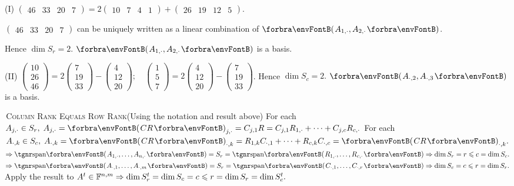 \documentclass[a4paper, 11pt, UTF8]{article}
\begin{document}
\begin{large}
(I) {\normalsize$\begin{pmatrix} 46 & 33 & 20 & 7 \end{pmatrix}=2\begin{pmatrix} 10 & 7 & 4 & 1\end{pmatrix}+\begin{pmatrix} 26 & 19 & 12 & 5\end{pmatrix}$}.\vspace{3pt}\par\quad\HI
{\small$\begin{pmatrix} 46 & 33 & 20 & 7 \end{pmatrix}$} can be uniquely written as a linear combination of $\Par{A_{1,\cdot},A_{2,\cdot}}$.\vspace{3pt}\par\quad\HI
Hence $\dim S_r=2$. $\Par{A_{1,\cdot},A_{2,\cdot}}$ is a basis.\par\vspace{6pt}\quad\EndI
(II) {\normalsize$\begin{pmatrix} 10\\ 26\\ 46\end{pmatrix}=2\begin{pmatrix} 7\\ 19\\ 33\end{pmatrix}-\begin{pmatrix} 4\\ 12\\ 20\end{pmatrix}; \quad \begin{pmatrix} 1\\ 5\\ 7\end{pmatrix}=2\begin{pmatrix} 4\\ 12\\ 20\end{pmatrix}-\begin{pmatrix} 7\\ 19\\ 33\end{pmatrix}$}. \;Hence $\dim S_c=2.$ $\Par{A_{\cdot,2},A_{\cdot,3}}$ is a basis.\vspace{6pt}\par
\SepLine
\pagebreak

\BulletPoint \,\hspace{1pt}\textsc{Column Rank Equals Row Rank}\quad (Using the notation and result above)\TextB{}
For each $A_{j,\cdot}\in S_r,\;A_{j,\cdot}=\Par{CR}_{j,\cdot}=C_{j,1}R=C_{j,1}R_{1,\cdot}+\dots+C_{j,c}R_{c,\cdot}$\TextB{}
For each $A_{\cdot,k}\in S_c,\;A_{\cdot,k}=\Par{CR}_{\cdot,k}=R_{1,k}C_{\cdot,1}+\dots+R_{c,k}C_{\cdot,c}=\Par{CR}_{\cdot,k}.$\TextB{}
$\Rightarrow\Span{A_{1,\cdot},\dots,A_{n,\cdot}}=S_r=\Span{R_{1,\cdot},\dots,R_{c,\cdot}}\Rightarrow\dim S_r=r\leqslant c=\dim S_c.$\TextB{}
$\Rightarrow\Span{A_{\cdot,1},\dots,A_{\cdot,m}}=S_r=\Span{C_{\cdot,1},\dots,C_{\cdot,r}}\Rightarrow\dim S_c=c\leqslant r=\dim S_r.$\TextB{}
\Or Apply the result to $A^t\in{\mathbb{F}}^{n,m}\Rightarrow\dim S_r^t=\dim S_c=c\leqslant r=\dim S_r=\dim S_c^t.$\PfEnd
\SepLine[10pt]


\end{large}
\end{document}
